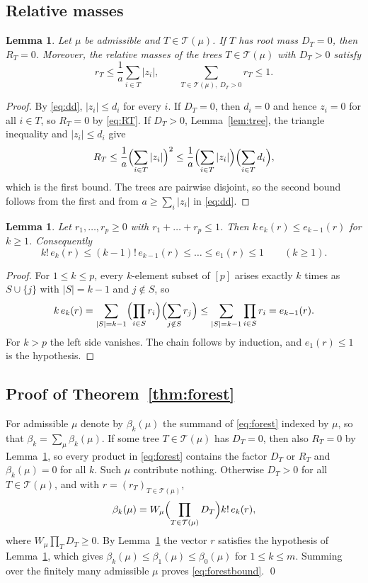 \documentclass[11pt]{amsart}
\newtheorem{lemma}[theorem]{Lemma}
\theoremstyle{remark}
\numberwithin{equation}{section}
\newcommand{\cT}{\mathcal{T}}
\begin{document}
\subsection{Relative masses}

\begin{lemma}\label{lem:mass}
Let $\mu$ be admissible and $T\in\cT(\mu)$. If $T$ has root mass $D_T=0$, then $R_T=0$. Moreover, the relative masses of the trees $T\in\cT(\mu)$ with $D_T>0$ satisfy
\[
r_T\le\frac1a\sum_{i\in T}|z_i|,\qquad\sum_{T\in\cT(\mu),\ D_T>0}r_T\le1 .
\]
\end{lemma}

\begin{proof}
By \eqref{eq:dd}, $|z_i|\le d_i$ for every $i$. If $D_T=0$, then $d_i=0$ and hence $z_i=0$ for all $i\in T$, so $R_T=0$ by \eqref{eq:RT}. If $D_T>0$, Lemma~\ref{lem:tree}, the triangle inequality and $|z_i|\le d_i$ give
\[
R_T\le\frac1a\Bigl(\sum_{i\in T}|z_i|\Bigr)^2\le\frac1a\Bigl(\sum_{i\in T}|z_i|\Bigr)\Bigl(\sum_{i\in T}d_i\Bigr),
\]
which is the first bound. The trees are pairwise disjoint, so the second bound follows from the first and from $a\ge\sum_i|z_i|$ in \eqref{eq:dd}.
\end{proof}

\begin{lemma}\label{lem:esym}
Let $r_1,\dots,r_p\ge0$ with $r_1+\dots+r_p\le1$. Then $k\,e_k(r)\le e_{k-1}(r)$ for $k\ge1$. Consequently
\[
k!\,e_k(r)\le(k-1)!\,e_{k-1}(r)\le\dots\le e_1(r)\le1\qquad(k\ge1).
\]
\end{lemma}

\begin{proof}
For $1\le k\le p$, every $k$-element subset of $[p]$ arises exactly $k$ times as $S\cup\{j\}$ with $|S|=k-1$ and $j\notin S$, so
\[
k\,e_k(r)=\sum_{|S|=k-1}\Bigl(\prod_{i\in S}r_i\Bigr)\Bigl(\sum_{j\notin S}r_j\Bigr)\le\sum_{|S|=k-1}\prod_{i\in S}r_i=e_{k-1}(r).
\]
For $k>p$ the left side vanishes. The chain follows by induction, and $e_1(r)\le1$ is the hypothesis.
\end{proof}

\subsection{Proof of Theorem~\ref{thm:forest}}

For admissible $\mu$ denote by $\beta_k(\mu)$ the summand of \eqref{eq:forest} indexed by $\mu$, so that $\beta_k=\sum_\mu\beta_k(\mu)$. If some tree $T\in\cT(\mu)$ has $D_T=0$, then also $R_T=0$ by Lemma~\ref{lem:mass}, so every product in \eqref{eq:forest} contains the factor $D_T$ or $R_T$ and $\beta_k(\mu)=0$ for all $k$. Such $\mu$ contribute nothing. Otherwise $D_T>0$ for all $T\in\cT(\mu)$, and with $r=(r_T)_{T\in\cT(\mu)}$,
\[
\beta_k(\mu)=W_\mu\Bigl(\prod_{T\in\cT(\mu)}D_T\Bigr)k!\,e_k(r),
\]
where $W_\mu\prod_TD_T\ge0$. By Lemma~\ref{lem:mass} the vector $r$ satisfies the hypothesis of Lemma~\ref{lem:esym}, which gives $\beta_k(\mu)\le\beta_1(\mu)\le\beta_0(\mu)$ for $1\le k\le m$. Summing over the finitely many admissible $\mu$ proves \eqref{eq:forestbound}. \qed
\end{document}
